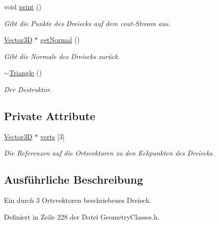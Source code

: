 \begin{DoxyCompactItemize}
void \hyperlink{classTriangle_abc3785b96e03fde1b5f594f8ed6afabb}{print} ()
\begin{DoxyCompactList}\small\item\em Gibt die Punkte des Dreiecks auf dem cout-\/\-Stream aus. \end{DoxyCompactList}\item 
\hyperlink{classVector3D}{Vector3\-D} $\ast$ \hyperlink{classTriangle_a3c72b19f316fa9ffb0a2f206e3558790}{get\-Normal} ()
\begin{DoxyCompactList}\small\item\em Gibt die Normale des Dreiecks zurück. \end{DoxyCompactList}\item 
\hyperlink{classTriangle_a5199760a17454f4dc94c855a57e3a152}{$\sim$\-Triangle} ()
\begin{DoxyCompactList}\small\item\em Der Destruktor. \end{DoxyCompactList}\end{DoxyCompactItemize}
\subsection*{Private Attribute}
\begin{DoxyCompactItemize}
\item 
\hyperlink{classVector3D}{Vector3\-D} $\ast$ \hyperlink{classTriangle_aa5ac3f568e42e746f7bd8be658e50060}{verts} \mbox{[}3\mbox{]}
\begin{DoxyCompactList}\small\item\em Die Referenzen auf die Ortsvektoren zu den Eckpunkten des Dreiecks. \end{DoxyCompactList}\end{DoxyCompactItemize}


\subsection{Ausführliche Beschreibung}
Ein durch 3 Ortsvektoren beschriebenes Dreieck. 

Definiert in Zeile 228 der Datei Geometry\-Classes.\-h.



